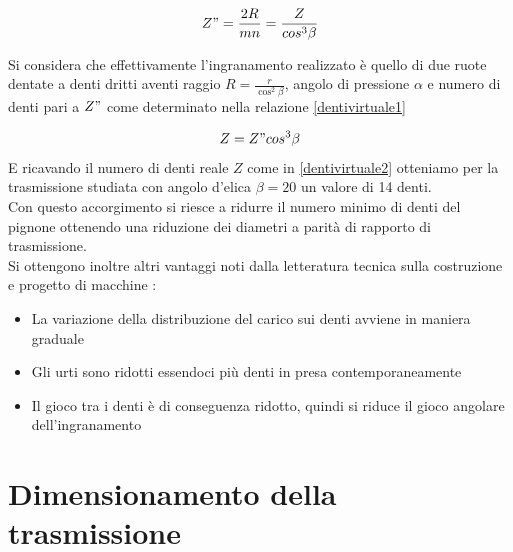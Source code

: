 \documentclass[%
corpo=11pt,
twoside,
 stile=classica,
oldstyle,
greek,%
]{toptesi}
\begin{document}
	\begin{equation}\label{dentivirtuale1}
	Z"=\frac{2R}{mn}=\frac{Z}{cos^3\beta}
	\end{equation}  
	
	Si considera che effettivamente l'ingranamento realizzato è quello di due ruote dentate a denti dritti aventi raggio $R=\frac{r}{\cos^2\beta}$, angolo di pressione $\alpha$ e numero di denti pari a $Z"$ come determinato nella relazione \ref{dentivirtuale1}
	
	\begin{equation}\label{dentivirtuale2}
	Z=Z" cos^3\beta
	\end{equation} 
	E ricavando il numero di denti reale $Z$ come in \ref{dentivirtuale2} otteniamo per la trasmissione studiata con angolo d'elica $\beta=20$ un valore di 14 denti. \\
	Con questo accorgimento si riesce a ridurre il numero minimo di denti del pignone ottenendo una riduzione dei diametri a parità di rapporto di trasmissione.\\
	 Si ottengono inoltre altri vantaggi noti dalla letteratura tecnica sulla costruzione e progetto di macchine :
	\begin{itemize}
		\item La variazione della distribuzione del carico sui denti avviene in maniera graduale 
		\item Gli urti sono ridotti essendoci più denti in presa contemporaneamente
		\item Il gioco tra i denti è di conseguenza ridotto, quindi si riduce il gioco angolare dell'ingranamento
	\end{itemize}

	\section{Dimensionamento della trasmissione}
	
\end{document}
